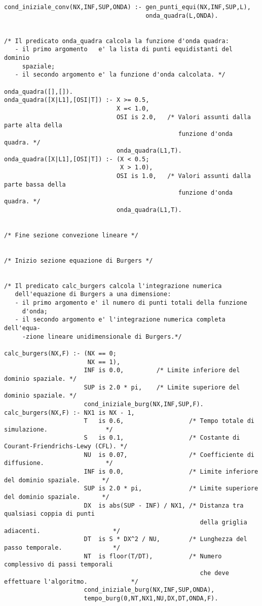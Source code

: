 \begin{verbatim}
cond_iniziale_conv(NX,INF,SUP,ONDA) :- gen_punti_equi(NX,INF,SUP,L),
                                       onda_quadra(L,ONDA).


/* Il predicato onda_quadra calcola la funzione d'onda quadra:
   - il primo argomento   e' la lista di punti equidistanti del dominio
     spaziale;
   - il secondo argomento e' la funzione d'onda calcolata. */

onda_quadra([],[]).
onda_quadra([X|L1],[OSI|T]) :- X >= 0.5,
                               X =< 1.0,
                               OSI is 2.0,   /* Valori assunti dalla parte alta della
                                                funzione d'onda quadra. */
                               onda_quadra(L1,T).
onda_quadra([X|L1],[OSI|T]) :- (X < 0.5; 
                                X > 1.0),
                               OSI is 1.0,   /* Valori assunti dalla parte bassa della
                                                funzione d'onda quadra. */
                               onda_quadra(L1,T).


/* Fine sezione convezione lineare */


/* Inizio sezione equazione di Burgers */


/* Il predicato calc_burgers calcola l'integrazione numerica
   dell'equazione di Burgers a una dimensione:
   - il primo argomento e' il numero di punti totali della funzione
     d'onda;
   - il secondo argomento e' l'integrazione numerica completa dell'equa-
     -zione lineare unidimensionale di Burgers.*/

calc_burgers(NX,F) :- (NX == 0;
                       NX == 1),
                      INF is 0.0,         /* Limite inferiore del dominio spaziale. */
                      SUP is 2.0 * pi,    /* Limite superiore del dominio spaziale. */
                      cond_iniziale_burg(NX,INF,SUP,F).
calc_burgers(NX,F) :- NX1 is NX - 1,
                      T   is 0.6,                  /* Tempo totale di simulazione.                */
                      S   is 0.1,                  /* Costante di Courant-Friendrichs-Lewy (CFL). */
                      NU  is 0.07,                 /* Coefficiente di diffusione.                 */
                      INF is 0.0,                  /* Limite inferiore del dominio spaziale.      */
                      SUP is 2.0 * pi,             /* Limite superiore del dominio spaziale.      */
                      DX  is abs(SUP - INF) / NX1, /* Distanza tra qualsiasi coppia di punti
                                                      della griglia adiacenti.                    */
                      DT  is S * DX^2 / NU,        /* Lunghezza del passo temporale.              */
                      NT  is floor(T/DT),          /* Numero complessivo di passi temporali
                                                      che deve effettuare l'algoritmo.            */
                      cond_iniziale_burg(NX,INF,SUP,ONDA),
                      tempo_burg(0,NT,NX1,NU,DX,DT,ONDA,F).



\end{verbatim}
